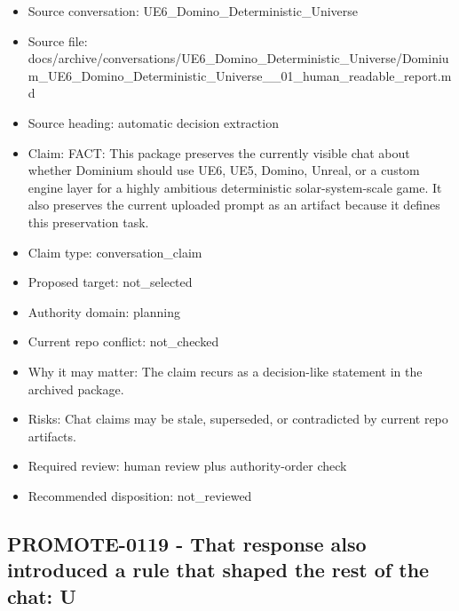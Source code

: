 \documentclass[11pt,a4paper]{report}
\begin{document}
\begin{itemize}
\item Source conversation: UE6\_Domino\_Deterministic\_Universe
\item Source file: docs/archive/conversations/UE6\_Domino\_Deterministic\_Universe/Dominium\_UE6\_Domino\_Deterministic\_Universe\_\_01\_human\_readable\_report.md
\item Source heading: automatic decision extraction
\item Claim: FACT: This package preserves the currently visible chat about whether Dominium should use UE6, UE5, Domino, Unreal, or a custom engine layer for a highly ambitious deterministic solar-system-scale game. It also preserves the current uploaded prompt as an artifact because it defines this preservation task.
\item Claim type: conversation\_claim
\item Proposed target: not\_selected
\item Authority domain: planning
\item Current repo conflict: not\_checked
\item Why it may matter: The claim recurs as a decision-like statement in the archived package.
\item Risks: Chat claims may be stale, superseded, or contradicted by current repo artifacts.
\item Required review: human review plus authority-order check
\item Recommended disposition: not\_reviewed
\end{itemize}

\subsection{PROMOTE-0119 - That response also introduced a rule that shaped the rest of the chat: U}
\end{document}
